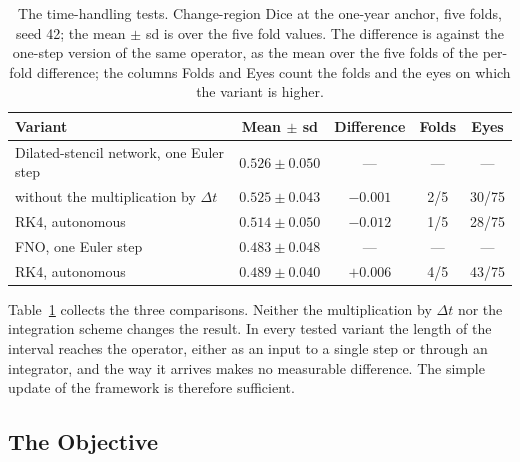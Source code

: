 \begin{table}[h]
  \centering
  \caption[The time-handling tests.]{%
    The time-handling tests. Change-region Dice at the one-year anchor,
    five folds, seed 42; the mean $\pm$ sd is over the five fold values. The
    difference is against the one-step version of the same operator, as the
    mean over the five folds of the per-fold difference; the columns Folds
    and Eyes count the folds and the eyes on which the variant is higher.}
  \label{tab:experiments:time}
  \footnotesize
  \begin{tabular}{l c c c c}
    \toprule
    Variant & Mean $\pm$ sd & Difference & Folds & Eyes \\
    \midrule
    Dilated-stencil network, one Euler step & $0.526 \pm 0.050$ & --- & --- & --- \\
    \quad without the multiplication by $\Delta t$ & $0.525 \pm 0.043$
      & $-0.001$ & 2/5 & 30/75 \\
    \quad RK4, autonomous & $0.514 \pm 0.050$ & $-0.012$ & 1/5 & 28/75 \\
    FNO, one Euler step & $0.483 \pm 0.048$ & --- & --- & --- \\
    \quad RK4, autonomous & $0.489 \pm 0.040$ & $+0.006$ & 4/5 & 43/75 \\
    \bottomrule
  \end{tabular}
\end{table}

Table~\ref{tab:experiments:time} collects the three comparisons.
Neither the multiplication by $\Delta t$ nor the integration scheme
changes the result. In every tested variant the length of the interval
reaches the operator, either as an input to a single step or through an
integrator, and the way it arrives makes no measurable difference. The
simple update of the framework is therefore sufficient.

\subsection{The Objective}
\label{sec:experiments:ablations:loss}

